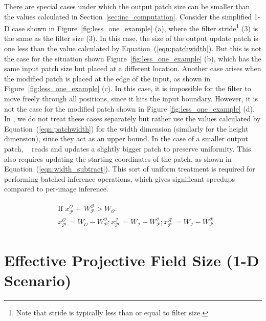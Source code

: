 There are special cases under which the output patch size can be smaller than the values calculated in Section~\ref{sec:inc_computation}. Consider the simplified 1-D case shown in Figure~\ref{fig:less_one_example} (a), where the filter stride\footnote{Note that stride is typically less than or equal to filter size.} (3) is the same as the filter size (3). In this case, the size of the output update patch is one less than the value calculated by Equation~(\ref{eqn:patchwidth}). But this is not the case for the situation shown Figure~\ref{fig:less_one_example} (b), which has the same input patch size but placed at a different location.
Another case arises when the modified patch is placed at the edge of the input, as shown in Figure~\ref{fig:less_one_example} (c). In this case, it is impossible for the filter to move freely through all positions, since it hits the input boundary. However, it is not the case for the modified patch shown in Figure \ref{fig:less_one_example} (d). In \system, we do not treat these cases separately but rather use the values calculated by Equation~(\ref{eqn:patchwidth}) for the width dimension (similarly for the height dimension), since they act as an upper bound. In the case of a smaller output patch, \system~ reads and updates a slightly bigger patch to preserve uniformity. This also requires updating the starting coordinates of the patch, as shown in Equation~(\ref{eqn:width_subtract}). This sort of uniform treatment is required for performing batched inference operations, which gives significant speedups compared to per-image inference.

\vspace{-4mm}
\begin{align}
\begin{split}
\label{eqn:width_subtract}
&\text{If~} x^\mathcal{O}_\mathcal{P} + ~W^\mathcal{O}_\mathcal{P} > W_{\mathcal{O}}:\\
&x^\mathcal{O}_\mathcal{P} ~ =  W_{\mathcal{O}} - W^\mathcal{O}_\mathcal{P}; 
x^\mathcal{I}_\mathcal{P} ~ = W_{\mathcal{I}} - W^\mathcal{I}_\mathcal{P}; 
x^\mathcal{R}_\mathcal{P} ~ = W_{\mathcal{I}} - W^\mathcal{R}_\mathcal{P}
\end{split}
\end{align}


\section{Effective Projective Field Size (1-D Scenario)}

